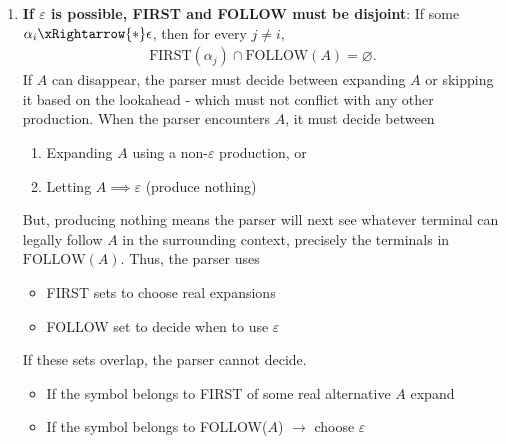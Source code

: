 \documentclass{report}
\begin{document}
\begin{itemize}
\begin{enumerate}
                \item \textbf{If $\varepsilon$ is possible, FIRST and FOLLOW must be disjoint}: If some $\alpha_{i} \xRightarrow{*} \epsilon$, then for every $j \ne i$,
                    \begin{align*}
                        \text{FIRST}(\alpha_{j}) \cap \text{FOLLOW}(A) = \varnothing
                    .\end{align*}
                    If $A$ can disappear, the parser must decide between expanding $A$ or skipping it based on the lookahead - which must not conflict with any other production. When the parser encounters $A$, it must decide between
                    \begin{enumerate}
                        \item Expanding $A$ using a non-$\varepsilon$ production, or
                        \item Letting $A \implies \varepsilon$ (produce nothing)
                    \end{enumerate}
                    But, producing nothing means the parser will next see whatever terminal can legally follow $A$ in the surrounding context, precisely the terminals in $\text{FOLLOW}(A)$. Thus, the parser uses
                    \begin{itemize}
                        \item FIRST sets to choose real expansions
                        \item FOLLOW set to decide when to use $\varepsilon$
                    \end{itemize}
                    If these sets overlap, the parser cannot decide.
                    \begin{itemize}
                        \item If the symbol belongs to FIRST of some real alternative $A$ expand
                        \item If the symbol belongs to FOLLOW($A$) $\to$ choose $\varepsilon$
                    \end{itemize}


\end{enumerate}
\end{itemize}
\end{document}
